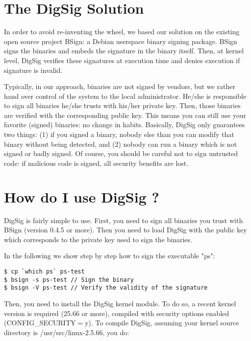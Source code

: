 \documentclass{article}
\begin{document}

\section{The DigSig Solution}

In order to avoid re-inventing the wheel, we based our solution on the
existing open source project BSign: a Debian userspace binary
signing package. BSign signs the binaries and embeds the signature in
the binary itself. Then, at kernel level, DigSig verifies these 
signatures at execution time and denies execution if signature is invalid. 

Typically, in our approach, binaries are not signed by vendors, but we
rather hand over control of the system to the local administrator.
He/she is responsible to sign all binaries he/she trusts with his/her
private key. Then, those binaries are verified with the corresponding
public key. This means you can still use your favorite (signed)
binaries: no change in habits. Basically, DigSig only guarantees two
things: (1) if you signed a binary, nobody else than you can modify
that binary without being detected, and (2) nobody can run a binary
which is not signed or badly signed.  Of course, you should be careful
not to sign untrusted code: if malicious code is signed, all security
benefits are lost.

\section{How do I use DigSig ?}
DigSig is fairly simple to use. First, you need to sign all binaries
you trust with BSign (version 0.4.5 or more). Then you need to load
DigSig with the public key which corresponds to the private key
used to sign the binaries.

In the following we show step by step how to sign the executable "ps":

\small
\begin{verbatim} 
$ cp `which ps` ps-test
$ bsign -s ps-test // Sign the binary
$ bsign -V ps-test // Verify the validity of the signature 
\end{verbatim} 
\normalsize

Then, you need to install the DigSig kernel module. To do so, a recent
kernel version is required (25.66 or more), compiled with security
options enabled (CONFIG\_SECURITY$=$y).  To compile DigSig, assuming your
kernel source directory is /usr/src/linux-2.5.66, you do:
\end{document}

